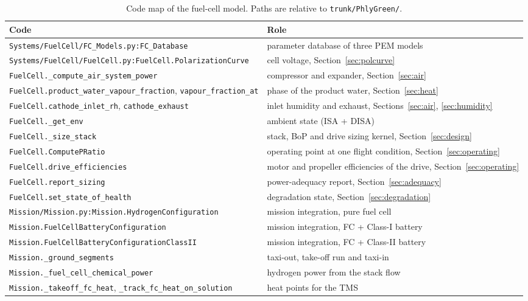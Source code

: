 \documentclass[a4paper,11pt]{article}
\newcommand{\fn}[1]{\nolinkurl{#1}}
\begin{document}
\begin{table}[ht]
\centering\small
\caption{Code map of the fuel-cell model. Paths are relative to \fn{trunk/PhlyGreen/}.}
\label{tab:code-map}
\begin{tabularx}{\textwidth}{@{}lX@{}}
\toprule
Code & Role \\
\midrule
\fn{Systems/FuelCell/FC_Models.py:FC_Database} & parameter database of three PEM models \\
\fn{Systems/FuelCell/FuelCell.py:FuelCell.PolarizationCurve} & cell voltage, Section~\ref{sec:polcurve} \\
\fn{FuelCell._compute_air_system_power} & compressor and expander, Section~\ref{sec:air} \\
\fn{FuelCell.product_water_vapour_fraction}, \fn{vapour_fraction_at} & phase of the product water, Section~\ref{sec:heat} \\
\fn{FuelCell.cathode_inlet_rh}, \fn{cathode_exhaust} & inlet humidity and exhaust, Sections~\ref{sec:air}, \ref{sec:humidity} \\
\fn{FuelCell._get_env} & ambient state (ISA + DISA) \\
\fn{FuelCell._size_stack} & stack, BoP and drive sizing kernel, Section~\ref{sec:design} \\
\fn{FuelCell.ComputePRatio} & operating point at one flight condition, Section~\ref{sec:operating} \\
\fn{FuelCell.drive_efficiencies} & motor and propeller efficiencies of the drive, Section~\ref{sec:operating} \\
\fn{FuelCell.report_sizing} & power-adequacy report, Section~\ref{sec:adequacy} \\
\fn{FuelCell.set_state_of_health} & degradation state, Section~\ref{sec:degradation} \\
\fn{Mission/Mission.py:Mission.HydrogenConfiguration} & mission integration, pure fuel cell \\
\fn{Mission.FuelCellBatteryConfiguration} & mission integration, FC + Class-I battery \\
\fn{Mission.FuelCellBatteryConfigurationClassII} & mission integration, FC + Class-II battery \\
\fn{Mission._ground_segments} & taxi-out, take-off run and taxi-in \\
\fn{Mission._fuel_cell_chemical_power} & hydrogen power from the stack flow \\
\fn{Mission._takeoff_fc_heat}, \fn{_track_fc_heat_on_solution} & heat points for the TMS \\

\end{tabularx}
\end{table}
\end{document}
